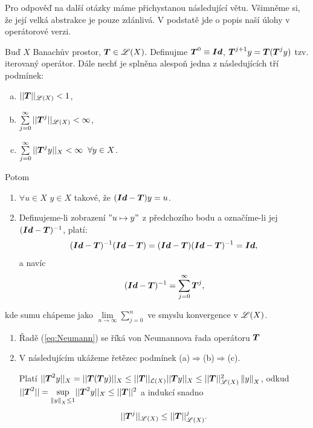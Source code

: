 Pro odpověď na další otázky máme přichystanou následující větu. Všimněme si, že její velká abstrakce je pouze zdánlivá. V podstatě jde o popis naší úlohy v operátorové verzi.


\begin{theorem}
\label{theorem:str14}
Buď $X$ Banachův prostor, $ \boldsymbol{T} \in\mathscr{L}(X)$. Definujme $ \boldsymbol{T} ^0\equiv \boldsymbol{Id}$, $ \boldsymbol{T} ^{j+1}y= \boldsymbol{T} ( \boldsymbol{T} ^jy)$ tzv. iterovaný operátor. Dále nechť je splněna alespoň jedna z následujících tří podmínek:
\begin{enumerate}[(a)]
    \item $|| \boldsymbol{T} ||_{\mathscr{L}(X)}<1$,
    \item $\sum\limits_{j=0}^\infty|| \boldsymbol{T} ^j||_{\mathscr{L}(X)}<\infty$,
    \item $\sum\limits_{j=0}^\infty|| \boldsymbol{T} ^jy||_X<\infty \;\;\forall y\in X$.
\end{enumerate}
Potom
\begin{enumerate}
    \item $\forall u \in X$  $y\in X$ takové, že $(\boldsymbol{Id}- \boldsymbol{T} )y=u$.
    \item Definujeme-li zobrazení $"u\mapsto y"$ z předchozího bodu a označíme-li jej $(\boldsymbol{Id}- \boldsymbol{T} )^{-1}$, platí:
    \begin{equation}
        (\boldsymbol{Id}- \boldsymbol{T} )^{-1}(\boldsymbol{Id}- \boldsymbol{T} ) = (\boldsymbol{Id}- \boldsymbol{T} )(\boldsymbol{Id}- \boldsymbol{T} )^{-1}=\boldsymbol{Id},
    \end{equation}
    a navíc
    \begin{equation}
        (\boldsymbol{Id}- \boldsymbol{T} )^{-1}=\sum\limits_{j=0}^\infty  \boldsymbol{T} ^j,
        \label{eq:Neumann}
    \end{equation}
\end{enumerate}
kde sumu chápeme jako $\lim\limits_{n\rightarrow\infty} \sum\limits_{j=0}^{n}$ ve smyslu konvergence v $\mathscr{L}(X)$.
\end{theorem} 

\begin{remark} 
\begin{enumerate}
    \item Řadě (\ref{eq:Neumann}) se říká von Neumannova řada operátoru $ \boldsymbol{T} $
    \item V následujícím ukážeme řetězec podmínek (a)$\Rightarrow$(b)$\Rightarrow$(c).
    
    Platí $|| \boldsymbol{T} ^2y||_X = || \boldsymbol{T} ( \boldsymbol{T} y)||_X\leq|| \boldsymbol{T} ||_{\mathcal{L}(X)}|| \boldsymbol{T} y||_X\leq|| \boldsymbol{T} ||^2_{\mathscr{L}(X)}\left\lVert y\right\rVert_X$, odkud $|| \boldsymbol{T} ^2||=\underset{\left\lVert y\right\rVert_X\leq 1}{\sup}|| \boldsymbol{T} ^2y||_X\leq|| \boldsymbol{T} ||^2$ a indukcí snadno
    \begin{equation}
        || \boldsymbol{T} ^j||_{\mathscr{L}(X)}\leq || \boldsymbol{T} ||^j_{\mathscr{L}(X)}.
    \end{equation}
\end{enumerate}
\end{remark}

